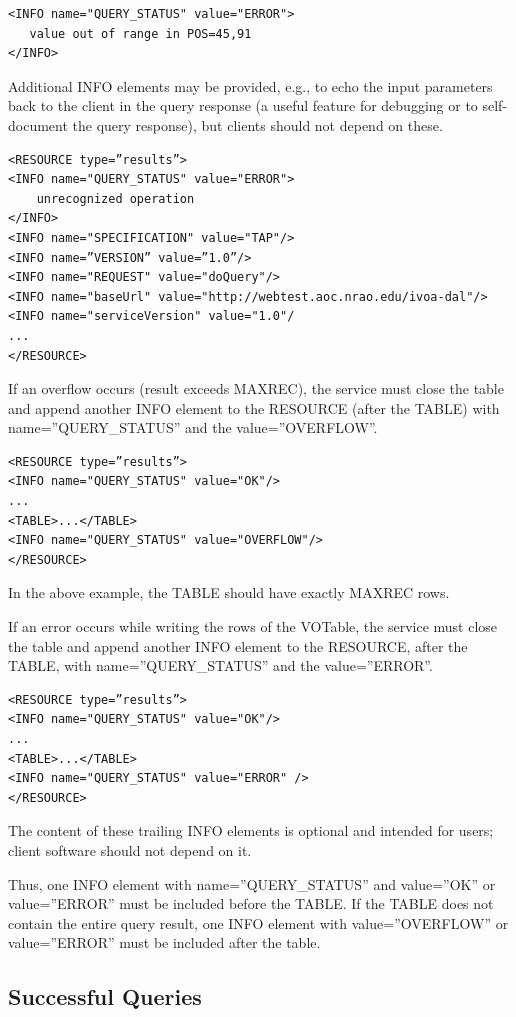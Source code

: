 \documentclass[11pt,letter]{ivoa}
\begin{document}
{\begin{verbatim}
<INFO name="QUERY_STATUS" value="ERROR">
   value out of range in POS=45,91
</INFO>
\end{verbatim}

Additional INFO elements may be provided, e.g., to echo the input parameters 
back to the client in the query response (a useful feature for debugging or to 
self-document the query response), but clients should not depend on these. 

\begin{verbatim}
<RESOURCE type=”results”>
<INFO name="QUERY_STATUS" value="ERROR">
    unrecognized operation
</INFO>
<INFO name="SPECIFICATION" value="TAP"/>
<INFO name=”VERSION” value=”1.0”/>
<INFO name="REQUEST" value="doQuery"/>
<INFO name="baseUrl" value="http://webtest.aoc.nrao.edu/ivoa-dal"/>
<INFO name="serviceVersion" value="1.0"/
...
</RESOURCE>
\end{verbatim}

If an overflow occurs (result exceeds MAXREC), the service must close the table 
and append another INFO element to the RESOURCE (after the TABLE) with 
name=”QUERY\_STATUS” and the value=”OVERFLOW”.
\begin{verbatim}
<RESOURCE type=”results”>
<INFO name="QUERY_STATUS" value="OK"/>
...
<TABLE>...</TABLE>
<INFO name="QUERY_STATUS" value="OVERFLOW"/>
</RESOURCE>
\end{verbatim}

In the above example, the TABLE should have exactly MAXREC rows.

If an error occurs while writing the rows of the VOTable, the service must 
close the table and append another INFO element to the RESOURCE, after the 
TABLE, with name=”QUERY\_STATUS” and the value=”ERROR”.
\begin{verbatim}
<RESOURCE type=”results”>
<INFO name="QUERY_STATUS" value="OK"/>
...
<TABLE>...</TABLE>
<INFO name="QUERY_STATUS" value="ERROR" />
</RESOURCE>
\end{verbatim}
The content of these trailing INFO elements is optional and intended for users; 
client software should not depend on it.

Thus, one INFO element with name=”QUERY\_STATUS” and value=”OK” or 
value=”ERROR” must be included before the TABLE. If the TABLE does not contain 
the entire query result, one INFO element with value=”OVERFLOW” or 
value=”ERROR” must be included after the table. 

\subsection{Successful Queries}
\label{sec:query-ok}

}
\end{document}
